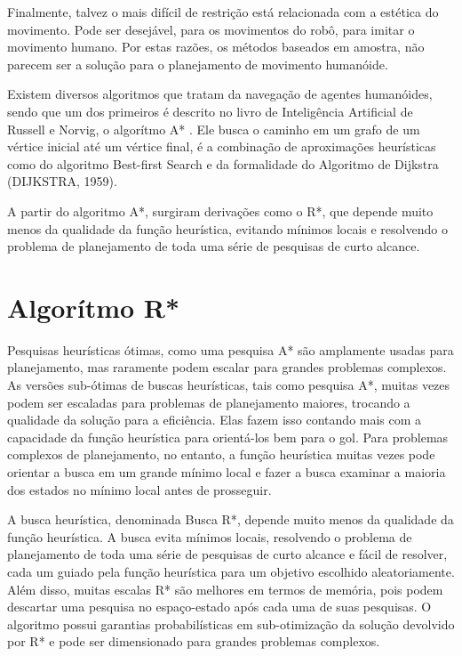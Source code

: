 Finalmente, talvez o mais difícil de restrição está relacionada com a estética do movimento. Pode ser desejável, para os movimentos 
do robô, para imitar o movimento humano. Por estas razões, os métodos baseados em amostra, não parecem ser a solução para o planejamento
de movimento humanóide.

Existem diversos algoritmos que tratam da navegação de agentes humanóides, sendo que um dos primeiros é descrito no livro de
Inteligência Artificial de Russell e Norvig, o algorítmo A* \cite{brussel}. Ele busca o caminho em um grafo de
um vértice inicial até um vértice final, é a combinação de aproximações heurísticas como do algoritmo Best-first Search e da
formalidade do Algoritmo de Dijkstra (DIJKSTRA, 1959). 

A partir do algoritmo A*, surgiram derivações como o R*\cite{plikhachev}, que depende muito menos da qualidade da função heurística, 
evitando mínimos locais e resolvendo o problema de planejamento de toda uma série de pesquisas de curto alcance.

\section{Algorítmo R*}

Pesquisas heurísticas ótimas, como uma pesquisa A* são amplamente usadas para planejamento, mas raramente podem escalar para grandes problemas complexos. 
As versões sub-ótimas de buscas heurísticas, tais como pesquisa A*, muitas vezes podem ser escaladas para problemas de planejamento maiores, trocando 
a qualidade da solução para a eficiência. Elas fazem isso contando mais com a capacidade da função heurística para orientá-los bem para o gol. Para
problemas complexos de planejamento, no entanto, a função heurística muitas vezes pode orientar a busca em um grande mínimo local e fazer a busca 
examinar a maioria dos estados no mínimo local antes de prosseguir.

A busca heurística, denominada Busca R*\cite{plikhachev}, depende muito menos da qualidade da função heurística. A busca evita mínimos locais, resolvendo
o problema de planejamento de toda uma série de pesquisas de curto alcance e fácil de resolver, cada um guiado pela função heurística para um objetivo
escolhido aleatoriamente. Além disso, muitas escalas R* são melhores em termos de memória, pois podem descartar uma pesquisa no espaço-estado após 
cada uma de suas pesquisas. O algoritmo possui garantias probabilísticas em sub-otimização da solução devolvido por R* e pode ser dimensionado para
grandes problemas complexos.


